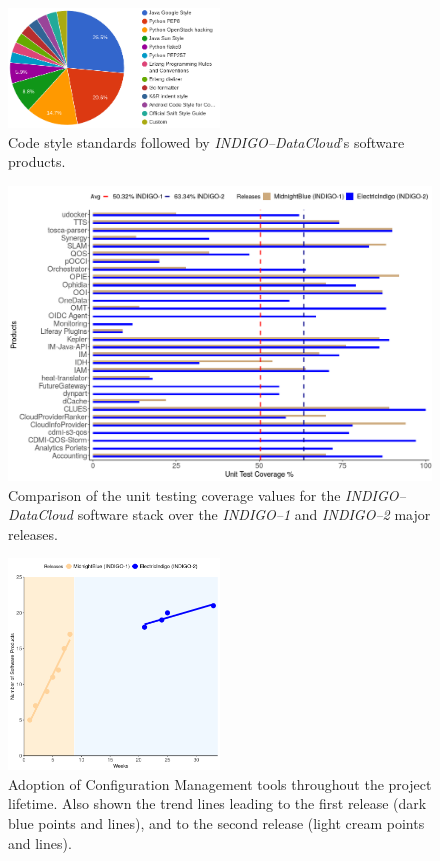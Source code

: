 \documentclass[journal]{IEEEtran}
\begin{document}
\begin{figure}[ht]
\centering
\includegraphics[width=0.5\textwidth]{images/codestyle.png}
\caption{Code style standards followed by {\sl INDIGO--DataCloud}'s software products.}
\label{fig:fig_codestyle}
\end{figure}

\begin{figure}[ht]
\centering
\includegraphics[width=\textwidth]{images/fig2.png}
\caption{Comparison of the unit testing coverage values for the {\sl INDIGO--DataCloud}
software stack over the {\sl INDIGO--1} and {\sl INDIGO--2} major releases.}
\label{fig:fig_unittest}
\end{figure}

\begin{figure}[ht]
\centering
\includegraphics[width=0.5\textwidth]{images/fig3.png}
\caption{Adoption of Configuration Management tools throughout the project lifetime. Also shown the trend lines
leading to the first release (dark blue points and lines), and to the second release (light cream points and lines).}
\label{fig:fig_confman}
\end{figure}
\end{document}
